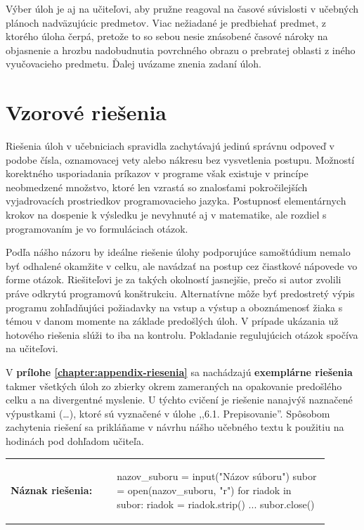 Výber úloh je aj na učiteľovi, aby pružne reagoval na časové súvislosti v učebných plánoch nadväzujúcic predmetov. Viac nežiadané je predbiehať predmet, z ktorého úloha čerpá, pretože to so sebou nesie znásobené časové nároky na objasnenie a hrozbu nadobudnutia povrchného obrazu o prebratej oblasti z iného vyučovacieho predmetu. Ďalej uvázame znenia zadaní úloh.









\section{Vzorové riešenia}
Riešenia úloh v učebniciach spravidla zachytávajú jedinú správnu odpoveď v podobe čísla, oznamovacej vety alebo nákresu bez vysvetlenia postupu. Možností korektného usporiadania príkazov v programe však existuje v princípe neobmedzené množstvo, ktoré len vzrastá so znalosťami pokročilejších vyjadrovacích prostriedkov programovacieho jazyka. Postupnosť elementárnych krokov na dospenie k výsledku je nevyhnuté aj v matematike, ale rozdiel s programovaním je vo formuláciach otázok. 

Podľa nášho názoru by ideálne riešenie úlohy podporujúce samoštúdium nemalo byť odhalené okamžite v celku, ale navádzať na postup cez čiastkové nápovede vo forme otázok. Riešiteľovi je za takých okolností jasnejšie, prečo si autor zvolili práve odkrytú programovú konštrukciu. Alternatívne môže byť predostretý výpis programu zohľadňujúci požiadavky na vstup a výstup a oboznámenosť žiaka s témou v danom momente na základe predošlých úloh. V prípade ukázania už hotového riešenia slúži to iba na kontrolu. Pokladanie regulujúcich otázok spočíva na učiteľovi. 

V \textbf{prílohe \ref{chapter:appendix-riesenia}} sa nachádzajú \textbf{exemplárne riešenia} takmer všetkých úloh zo zbierky okrem zameraných na opakovanie predošlého celku a na divergentné myslenie. U týchto cvičení je riešenie nanajvýš naznačené výpustkami (\dots), ktoré sú vyznačené v úlohe ,,6.1. Prepisovanie''. Spôsobom zachytenia riešení sa prikláňame v návrhu nášho učebného textu k použitiu na hodinách pod dohľadom učiteľa. 

\begin{tabular}{@{}p{0.3\linewidth}p{0.6\linewidth}}
\textbf{\small Náznak riešenia:} &
\vspace{-3em}
\begin{code}
nazov_suboru = input("Názov súboru")
subor = open(nazov_suboru, "r")
for riadok in subor:
    riadok = riadok.strip()
    ...
subor.close()
\end{code}
\end{tabular}

